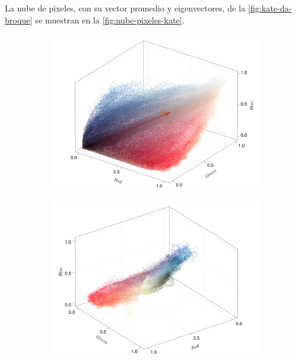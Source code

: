 La nube de pixeles, con su vector promedio y eigenvectores, de la \cref{fig:kate-da-broque} se muestran en la \cref{fig:nube-pixeles-kate}.
\begin{figure}[ht!]
    \centering
    \begin{subfigure}[c]{0.3\textwidth}
        \centering
        \includegraphics[scale=0.09]{../pictures/pixel_cloud_kate_1}
    \end{subfigure}
    \begin{subfigure}[c]{0.3\textwidth}
        \centering
        \includegraphics[scale=0.09]{../pictures/pixel_cloud_kate_2}
    \end{subfigure}
    \begin{subfigure}[c]{0.3\textwidth}

\end{subfigure}
\end{figure}

